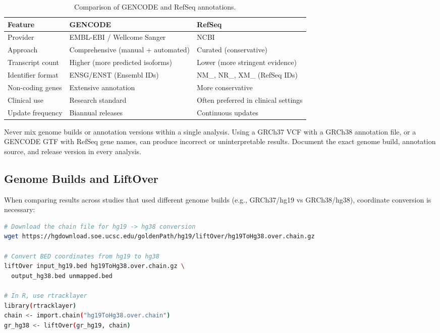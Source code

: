 \begin{table}[htbp]
\centering
\caption{Comparison of GENCODE and RefSeq annotations.}
\label{tab:gencode-vs-refseq}
\small
\begin{tabularx}{\textwidth}{@{}l X X@{}}
\toprule
\textbf{Feature} & \textbf{GENCODE} & \textbf{RefSeq} \\
\midrule
Provider & EMBL-EBI / Wellcome Sanger & NCBI \\
Approach & Comprehensive (manual + automated) & Curated (conservative) \\
Transcript count & Higher (more predicted isoforms) & Lower (more stringent evidence) \\
Identifier format & ENSG/ENST (Ensembl IDs) & NM\_, NR\_, XM\_ (RefSeq IDs) \\
Non-coding genes & Extensive annotation & More conservative \\
Clinical use & Research standard & Often preferred in clinical settings \\
Update frequency & Biannual releases & Continuous updates \\
\bottomrule
\end{tabularx}
\end{table}

\begin{warningbox}[title={Mixing References Is Dangerous}]
Never mix genome builds or annotation versions within a single analysis. Using a GRCh37 VCF with a GRCh38 annotation file, or a GENCODE GTF with RefSeq gene names, can produce incorrect or uninterpretable results. Document the exact genome build, annotation source, and release version in every analysis.
\end{warningbox}

\subsection{Genome Builds and LiftOver}

When comparing results across studies that used different genome builds (e.g., GRCh37/hg19 vs GRCh38/hg38), coordinate conversion is necessary:

\begin{lstlisting}[language=bash,caption={Converting coordinates between genome builds with liftOver.},label=lst:liftover]
# Download the chain file for hg19 -> hg38 conversion
wget https://hgdownload.soe.ucsc.edu/goldenPath/hg19/liftOver/hg19ToHg38.over.chain.gz

# Convert BED coordinates from hg19 to hg38
liftOver input_hg19.bed hg19ToHg38.over.chain.gz \
  output_hg38.bed unmapped.bed

# In R, use rtracklayer
library(rtracklayer)
chain <- import.chain("hg19ToHg38.over.chain")
gr_hg38 <- liftOver(gr_hg19, chain)
\end{lstlisting}

